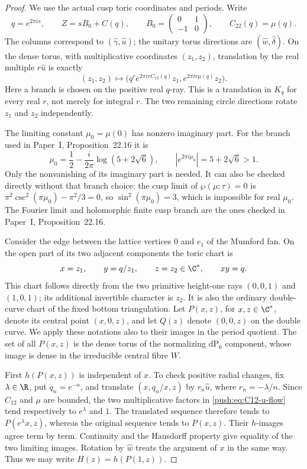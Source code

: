 \begin{proof}
We use the actual cusp toric coordinates and periods. Write
\[
 q=e^{2\pi i s},\qquad
 Z=sB_0+C(q),\qquad
 B_0=\begin{pmatrix}0&1\\-1&0\end{pmatrix},
 \qquad C_{22}(q)=\mu(q).
\]
The columns correspond to $(\widehat\gamma,\widehat u)$;
the unitary torus directions are $(\widehat w,\widehat\delta)$.
On the dense torus, with multiplicative coordinates $(z_1,z_2)$,
translation by the real multiple $r\widehat u$ is exactly
\begin{equation}\label{push:eq:C12-u-flow}
 (z_1,z_2)\longmapsto
 \bigl(q^r e^{2\pi i r C_{12}(q)}z_1,
             e^{2\pi i r\mu(q)}z_2\bigr).
\end{equation}
Here a branch is chosen on the positive real $q$-ray. This is a
translation in $K_q$ for every real $r$, not merely for integral $r$.
The two remaining circle directions rotate $z_1$ and $z_2$
independently.

The limiting constant $\mu_0=\mu(0)$ has nonzero imaginary part.
For the branch used in Paper~I, Proposition~22.16 it is
\[
 \mu_0=\frac12-\frac{i}{2\pi}\log(5+2\sqrt6),\qquad
 |e^{2\pi i\mu_0}|=5+2\sqrt6>1.
\]
Only the nonvanishing of its imaginary part is needed. It can
also be checked directly without that branch choice: the cusp
limit of $\wp(\mu;\tau)=0$ is
$\pi^2\csc^2(\pi\mu_0)-\pi^2/3=0$, so
$\sin^2(\pi\mu_0)=3$, which is impossible for real $\mu_0$.
The Fourier limit and holomorphic finite cusp branch are the
ones checked in Paper~I, Proposition~22.16.

Consider the edge between the lattice vertices $0$ and $e_1$
of the Mumford fan. On the open part of its two adjacent
components the toric chart is
\[
 x=z_1,\qquad y=q/z_1,\qquad z=z_2\in\C^*,
 \qquad xy=q.
\]
This chart follows directly from the two primitive height-one
rays $(0,0,1)$ and $(1,0,1)$; its additional invertible character
is $z_2$. It is also the ordinary double-curve chart of the
fixed bottom triangulation. Let $P(x,z)$, for $x,z\in\C^*$,
denote its central point $(x,0,z)$, and let $Q(z)$ denote
$(0,0,z)$ on the double curve. We apply these notations also
to their images in the period quotient. The set of all $P(x,z)$
is the dense torus of the normalizing $\mathrm{dP}_6$ component,
whose image is dense in the irreducible central fibre $W$.

First $h(P(x,z))$ is independent of $x$. To check positive
radial changes, fix $\lambda\in\R$, put $q_n=e^{-n}$, and
translate $(x,q_n/x,z)$ by
$r_n\widehat u$, where $r_n=-\lambda/n$. Since $C_{12}$ and
$\mu$ are bounded, the two multiplicative factors in
\eqref{push:eq:C12-u-flow} tend respectively to $e^\lambda$ and
$1$. The translated sequence therefore tends to $P(e^\lambda x,z)$,
whereas the original sequence tends to $P(x,z)$. Their $h$-images
agree term by term. Continuity and the Hausdorff property give
equality of the two limiting images. Rotation by
$\widehat w$ treats the argument of $x$ in the same way.
Thus we may write $H(z)=h(P(1,z))$.


\end{proof}
